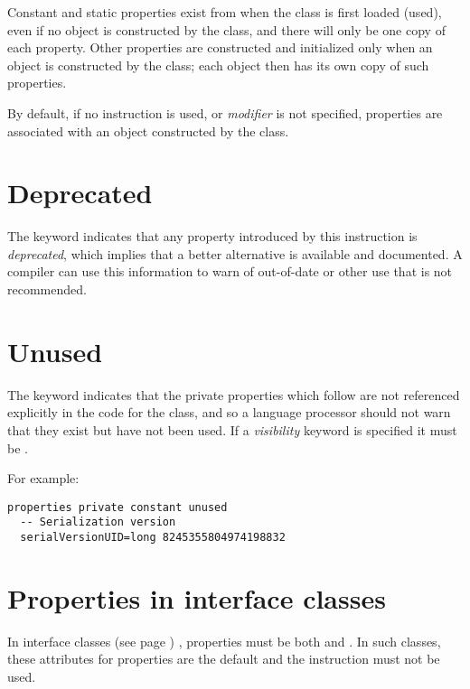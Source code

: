 Constant and static properties exist from when the class is first loaded
(used), even if no object is constructed by the class, and there will
only be one copy of each property.  Other properties are constructed and
initialized only when an object is constructed by the class; each object
then has its own copy of such properties.
 
By default, if no  instruction is used, or
\emph{modifier} is not specified, properties are associated with an
object constructed by the class.
\section{Deprecated}\label{refdeppro}
 
The keyword  indicates that any property introduced by
this instruction is \emph{deprecated}, which implies that a
better alternative is available and documented.  A compiler can
use this information to warn of out-of-date or other use that is
not recommended.
\section{Unused}\label{refunupro}
 
The keyword  indicates that the private properties
which follow are not referenced explicitly in the code for the class,
and so a language processor should not warn that they exist but have not
been used.
If a \emph{visibility} keyword is specified it must be
.
 
For example:
\begin{lstlisting}
properties private constant unused
  -- Serialization version
  serialVersionUID=long 8245355804974198832
\end{lstlisting}
\section{Properties in interface classes}
 
In  interface classes (see page \pageref{refinterf}) , properties must be both
 and .  In such classes, these
attributes for properties are the default and the 
instruction must not be used.
